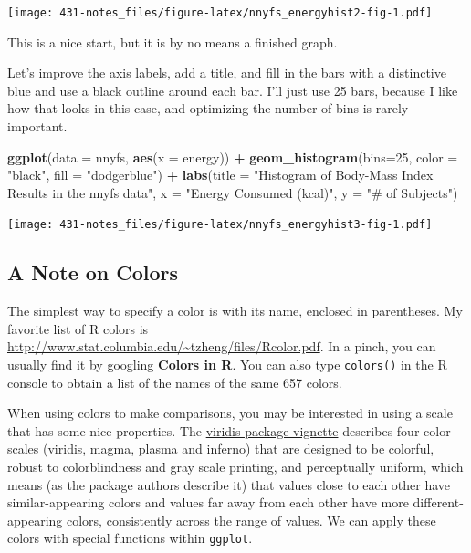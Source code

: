 \documentclass[
]{book}
\newenvironment{Shaded}{\begin{snugshade}}{\end{snugshade}}
\newcommand{\DataTypeTok}[1]{\textcolor[rgb]{0.13,0.29,0.53}{#1}}
\newcommand{\DecValTok}[1]{\textcolor[rgb]{0.00,0.00,0.81}{#1}}
\newcommand{\KeywordTok}[1]{\textcolor[rgb]{0.13,0.29,0.53}{\textbf{#1}}}
\newcommand{\NormalTok}[1]{#1}
\newcommand{\OperatorTok}[1]{\textcolor[rgb]{0.81,0.36,0.00}{\textbf{#1}}}
\newcommand{\StringTok}[1]{\textcolor[rgb]{0.31,0.60,0.02}{#1}}
\begin{document}
\texttt{[image: 431-notes\_files/figure-latex/nnyfs\_energyhist2-fig-1.pdf]}

This is a nice start, but it is by no means a finished graph.

Let's improve the axis labels, add a title, and fill in the bars with a distinctive blue and use a black outline around each bar. I'll just use 25 bars, because I like how that looks in this case, and optimizing the number of bins is rarely important.

\begin{Shaded}
\begin{Highlighting}[]
\KeywordTok{ggplot}\NormalTok{(}\DataTypeTok{data =}\NormalTok{ nnyfs, }\KeywordTok{aes}\NormalTok{(}\DataTypeTok{x =}\NormalTok{ energy)) }\OperatorTok{+}
\StringTok{    }\KeywordTok{geom_histogram}\NormalTok{(}\DataTypeTok{bins=}\DecValTok{25}\NormalTok{, }\DataTypeTok{color =} \StringTok{"black"}\NormalTok{, }\DataTypeTok{fill =} \StringTok{"dodgerblue"}\NormalTok{) }\OperatorTok{+}\StringTok{ }
\StringTok{    }\KeywordTok{labs}\NormalTok{(}\DataTypeTok{title =} \StringTok{"Histogram of Body-Mass Index Results in the nnyfs data"}\NormalTok{,}
         \DataTypeTok{x =} \StringTok{"Energy Consumed (kcal)"}\NormalTok{, }\DataTypeTok{y =} \StringTok{"# of Subjects"}\NormalTok{)}
\end{Highlighting}
\end{Shaded}

\texttt{[image: 431-notes\_files/figure-latex/nnyfs\_energyhist3-fig-1.pdf]}

\hypertarget{a-note-on-colors}{%
\subsection{A Note on Colors}\label{a-note-on-colors}}

The simplest way to specify a color is with its name, enclosed in parentheses. My favorite list of R colors is \url{http://www.stat.columbia.edu/~tzheng/files/Rcolor.pdf}. In a pinch, you can usually find it by googling \textbf{Colors in R}. You can also type \texttt{colors()} in the R console to obtain a list of the names of the same 657 colors.

When using colors to make comparisons, you may be interested in using a scale that has some nice properties. The \href{https://cran.r-project.org/web/packages/viridis/vignettes/intro-to-viridis.html}{viridis package vignette} describes four color scales (viridis, magma, plasma and inferno) that are designed to be colorful, robust to colorblindness and gray scale printing, and perceptually uniform, which means (as the package authors describe it) that values close to each other have similar-appearing colors and values far away from each other have more different-appearing colors, consistently across the range of values. We can apply these colors with special functions within \texttt{ggplot}.
\end{document}
